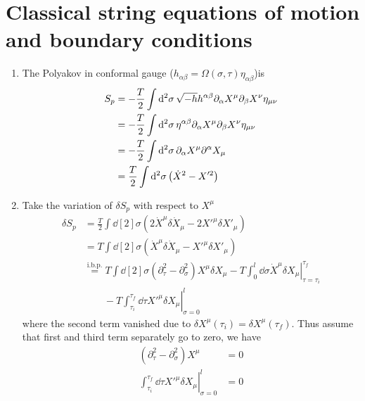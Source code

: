 \section{Classical string equations of motion and boundary conditions}
\begin{enumerate}[label=(\alph*)]
	\item The Polyakov in conformal gauge ($h_{\alpha\beta} = \Omega(\sigma,\tau) \eta_{\alpha\beta}$)is 
		\begin{align}
			S_p &= - \frac{T}{2} \int \dd[2]{\sigma} \sqrt{-h} h^{\alpha\beta} \partial_\alpha X^\mu \partial_\beta X^\nu \eta_{\mu\nu} \notag \\
				 &= - \frac{T}{2} \int \dd[2]{\sigma} \eta^{\alpha\beta} \partial_\alpha X^\mu \partial_\beta X^\nu \eta_{\mu\nu} \notag \\
				 &= - \frac{T}{2} \int \dd[2]{\sigma} \partial_\alpha X^\mu \partial^\alpha X_\mu \notag \\
				 &= \frac{T}{2} \int \dd[2]{\sigma} \left(  \dot{X}^2 - X'^2 \right)
		\end{align}

	\item 
		Take the variation of $\delta S_p$ with respect to $X^\mu$
		\begin{align*}
			\delta S_p &= \frac{T}{2} \int \dd[2]{\sigma} \left( 2 \dot{X}^\mu \delta \dot{X}_\mu - 2 X'^\mu \delta X'_\mu \right) \\
						  &= T \int \dd[2]{\sigma} \left( \dot{X}^\mu \delta \dot{X}_\mu - X'^\mu \delta X'_\mu \right) \\
						  &\stackrel{\text{i.b.p.}}{=} T \int \dd[2]{\sigma} \left( \partial_\tau^2   - \partial_\sigma^2  \right)X^\mu \delta X_\mu - T \left. \int_0^l \dd{\sigma} \dot{X}^\mu \delta X_\mu \right|_{\tau = \tau_i}^{\tau_f} \\
						  &\quad \quad - T \left. \int_{\tau_i}^{\tau_f} \dd{\tau} X'^\mu \delta X_\mu \right|_{\sigma=0}^l
		\end{align*}
		where the second term vanished due to $\delta X^\mu (\tau_i) = \delta X^\mu (\tau_f)$. Thus assume that first and third term separately go to zero, we have
		\begin{align}
			\left( \partial_\tau^2 - \partial_\sigma^2 \right) X^\mu &= 0 \\
			\left. \int_{\tau_i}^{\tau_f} \dd{\tau} X'^\mu \delta X_\mu \right|_{\sigma=0}^l & = 0 
		\end{align}


\end{enumerate}
